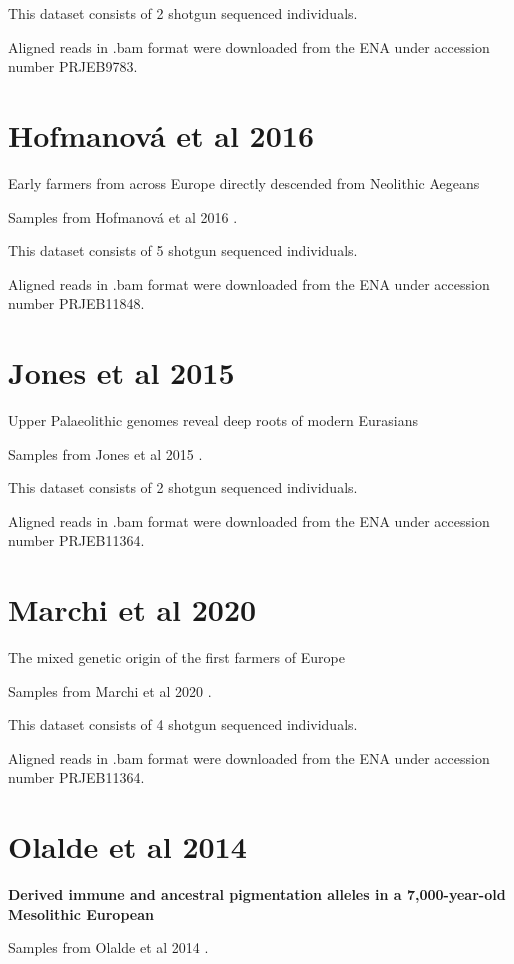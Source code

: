 This dataset consists of 2 shotgun sequenced individuals.

Aligned reads in .bam format were downloaded from the ENA under accession number PRJEB9783.

\section{Hofmanová et al 2016}

Early farmers from across Europe directly descended from Neolithic Aegeans

Samples from  Hofmanová et al 2016 \cite{Hofmanova2016}.

This dataset consists of 5 shotgun sequenced individuals.

Aligned reads in .bam format were downloaded from the ENA under accession number PRJEB11848.

\section{Jones et al 2015}

Upper Palaeolithic genomes reveal deep roots of modern Eurasians

Samples from  Jones et al 2015 \cite{Jones2015}.

This dataset consists of 2 shotgun sequenced individuals.

Aligned reads in .bam format were downloaded from the ENA under accession number PRJEB11364.

\section{Marchi et al 2020}

The mixed genetic origin of the first farmers of Europe

Samples from  Marchi et al 2020 \cite{marchi2020mixed}.

This dataset consists of 4 shotgun sequenced individuals.

Aligned reads in .bam format were downloaded from the ENA under accession number PRJEB11364.

\section{Olalde et al 2014}

\textbf{Derived immune and ancestral pigmentation alleles in a 7,000-year-old Mesolithic European}

Samples from  Olalde et al 2014 \cite{olalde2014derived}.


